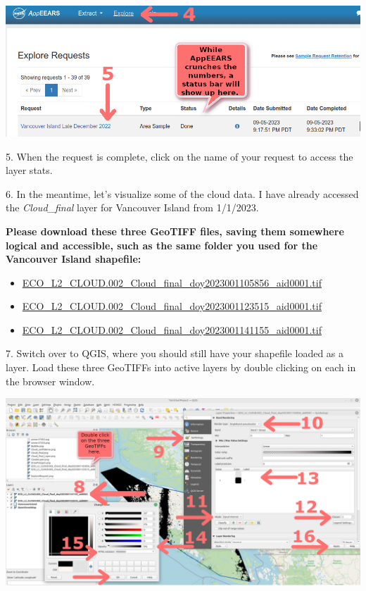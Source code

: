 \documentclass[oneside,a4paper,11pt,explicit]{book}
\begin{document}
	\centerline{\includegraphics[width=.75\textwidth]{ExploreRequest.png}}
	
	5. When the request is complete, click on the name of your request to access the layer stats.
	
	6. In the meantime, let's visualize some of the cloud data. I have already accessed the \textit{Cloud\_final} layer for Vancouver Island from 1/1/2023. 
	
	\begin{tcolorbox}[colback=yellow!5!white,title=\textbf{Vancouver Island \textit{Cloud\_final} Layer Files}]
			
		\textbf{Please download these three GeoTIFF files, saving them somewhere logical and accessible, such as the same folder you used for the Vancouver Island shapefile:}
			
		\vspace{-1em}
			
		\begin{itemize}
			\item \href{https://jeremydforsythe.github.io/icecream-tutorials/Tutorial7_CloudyDays/ECO_L2_CLOUD.002_Cloud_final_doy2023001105856_aid0001.tif}{ECO\_L2\_CLOUD.002\_Cloud\_final\_doy2023001105856\_aid0001.tif}
			\item \href{https://jeremydforsythe.github.io/icecream-tutorials/Tutorial7_CloudyDays/ECO_L2_CLOUD.002_Cloud_final_doy2023001123515_aid0001.tif}{ECO\_L2\_CLOUD.002\_Cloud\_final\_doy2023001123515\_aid0001.tif}
			\item \href{https://jeremydforsythe.github.io/icecream-tutorials/Tutorial7_CloudyDays/ECO_L2_CLOUD.002_Cloud_final_doy2023001141155_aid0001.tif}{ECO\_L2\_CLOUD.002\_Cloud\_final\_doy2023001141155\_aid0001.tif}
		\end{itemize}
			
	\end{tcolorbox}
	
	7. Switch over to QGIS, where you should still have your shapefile loaded as a layer. Load these three GeoTIFFs into active layers by double clicking on each in the browser window.
	
	\centerline{\includegraphics[width=.875\textwidth]{Cloud_final_AddLayer.png}}
	
\end{document}

